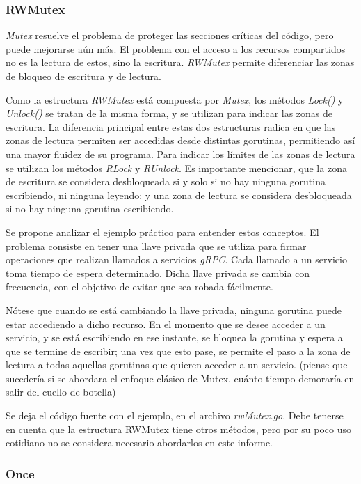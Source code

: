 \documentclass[10pt]{article} %
\begin{document}
\subsubsection{RWMutex}

\emph{Mutex} resuelve el problema de proteger las secciones críticas del código, pero puede mejorarse aún más. El problema con el acceso a los recursos compartidos no es la lectura de estos, sino la escritura. \emph{RWMutex} permite diferenciar las zonas de bloqueo de escritura y de lectura.

Como la estructura \emph{RWMutex} está compuesta por \emph{Mutex}, los métodos \emph{Lock()} y \emph{Unlock()} se tratan de la misma forma, y se utilizan para indicar las zonas de escritura. La diferencia principal entre estas dos estructuras radica en que las zonas de lectura permiten ser accedidas desde distintas gorutinas, permitiendo así una mayor fluidez de su programa. Para indicar los límites de las zonas de lectura se utilizan los métodos \emph{RLock} y \emph{RUnlock}. Es importante mencionar, que la zona de escritura se considera desbloqueada si y solo si no hay ninguna gorutina escribiendo, ni ninguna leyendo; y una zona de lectura se considera desbloqueada si no hay ninguna gorutina escribiendo.

Se propone analizar el ejemplo práctico para entender estos conceptos. El problema consiste en tener una llave privada que se utiliza para firmar operaciones que realizan llamados a servicios \textit{gRPC}. Cada llamado a un servicio toma tiempo de espera determinado. Dicha llave privada se cambia con frecuencia, con el objetivo de evitar que sea robada fácilmente. 

Nótese que cuando se está cambiando la llave privada, ninguna gorutina puede estar accediendo a dicho recurso. En el momento que se desee acceder a un servicio, y se está escribiendo en ese instante, se bloquea la gorutina y espera a que se termine de escribir; una vez que esto pase, se permite el paso a la zona de lectura a todas aquellas gorutinas que quieren acceder a un servicio. (piense que sucedería si se abordara el enfoque clásico de Mutex, cuánto tiempo demoraría en salir del cuello de botella) 

Se deja el código fuente con el ejemplo, en el archivo \textit{rwMutex.go}. Debe tenerse en cuenta que la estructura RWMutex tiene otros métodos, pero por su poco uso cotidiano no se considera necesario abordarlos en este informe.

\subsubsection{Once}
\end{document}
